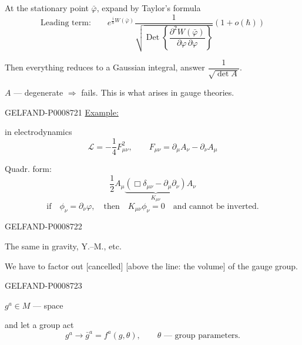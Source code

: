 At the stationary point $\bar\varphi$, expand by Taylor's formula
\begin{equation*}
\text{Leading term:}\qquad
e^{\frac{i}{\hbar}W(\bar\varphi)}
\frac1{\sqrt{\operatorname{Det}\left\{\dfrac{\partial^2W(\bar\varphi)}{\partial\varphi\,\partial\varphi}\right\}}}
(1+o(\hbar))
\tag{7}
\end{equation*}

Then everything reduces to a Gaussian integral, answer $\dfrac1{\sqrt{\det A}}$.

$A$ --- degenerate $\Rightarrow$ fails. This is what arises in gauge theories.


\begin{GelfandAdjacentEvidence}{GELFAND-P000872}{1}
\uline{Example:}

in electrodynamics
\begin{equation*}
\mathcal L=-\frac14F_{\mu\nu}^2,\qquad
F_{\mu\nu}=\partial_\mu A_\nu-\partial_\nu A_\mu
\tag{8}
\end{equation*}

Quadr. form:
\begin{equation*}
\frac12 A_\mu\underbrace{(\Box\delta_{\mu\nu}-\partial_\mu\partial_\nu)}_{K_{\mu\nu}}A_\nu
\tag{9}
\end{equation*}
\begin{equation*}
\text{if}\quad\phi_\nu=\partial_\nu\varphi,
\quad\text{then}\quad K_{\mu\nu}\phi_\nu=0
\quad\text{and cannot be inverted.}
\tag{10}
\end{equation*}
\end{GelfandAdjacentEvidence}
\begin{GelfandAdjacentEvidence}{GELFAND-P000872}{2}


The same in gravity, Y.–M., etc.

We have to factor out [cancelled] [above the line: the volume] of the gauge group.
\end{GelfandAdjacentEvidence}
\begin{GelfandAdjacentEvidence}{GELFAND-P000872}{3}


$g^a\in M$ --- space

and let a group act
\begin{equation*}
g^a\longrightarrow\bar g^a=f^a(g,\theta),
\qquad\theta\text{ --- group parameters.}
\tag{11}
\end{equation*}
\end{GelfandAdjacentEvidence}
